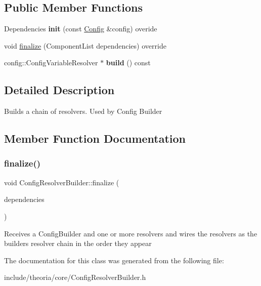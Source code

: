\subsection*{Public Member Functions}
\begin{DoxyCompactItemize}
\item 
\mbox{\label{classConfigResolverBuilder_a4e217cbe1d663a83d098e224cc4d7cb8}} 
Dependencies {\bfseries init} (const \hyperlink{classtheoria_1_1config_1_1Config}{Config} \&config) overide
\item 
void \hyperlink{classConfigResolverBuilder_a77c367a65b4e8fb6285b63fba0bdbef0}{finalize} (Component\+List dependencies) override
\item 
\mbox{\label{classConfigResolverBuilder_aaab8623502528a6de4129b1016f02224}} 
config\+::\+Config\+Variable\+Resolver $\ast$ {\bfseries build} () const
\end{DoxyCompactItemize}


\subsection{Detailed Description}
Builds a chain of resolvers. Used by Config Builder 

\subsection{Member Function Documentation}
\mbox{\label{classConfigResolverBuilder_a77c367a65b4e8fb6285b63fba0bdbef0}} 
\subsubsection{\texorpdfstring{finalize()}{finalize()}}
{\footnotesize\ttfamily void Config\+Resolver\+Builder\+::finalize (\begin{DoxyParamCaption}\item[{Component\+List}]{dependencies }\end{DoxyParamCaption})\hspace{0.3cm}{\ttfamily [override]}}

Receives a Config\+Builder and one or more resolvers and wires the resolvers as the builders resolver chain in the order they appear 

The documentation for this class was generated from the following file\+:\begin{DoxyCompactItemize}
\item 
include/theoria/core/Config\+Resolver\+Builder.\+h\end{DoxyCompactItemize}
